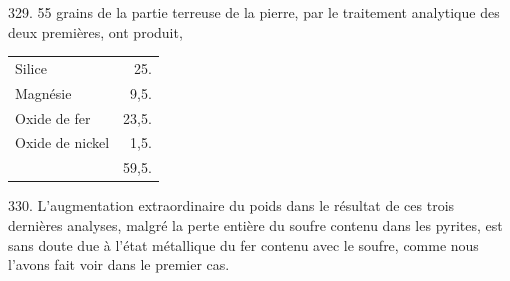\documentclass[a4paper, 11pt, oneside, polutonikogreek, french]{article}
\begin{document}
329. 55 grains de la partie terreuse de la pierre, par le traitement analytique des deux premières, ont produit,

\begin{table}[!ht]
    \centering
    \bfseries
    \Fontauri
    \Large
    \begin{tabular}{l r}
        Silice & 25. \\
        Magnésie & 9,5. \\
        Oxide de fer & 23,5. \\
        Oxide de nickel & 1,5. \\ \hline
        ~ & 59,5. \\
    \end{tabular}
\end{table}

330. L'augmentation extraordinaire du poids dans le résultat de ces trois dernières analyses, malgré la perte entière du soufre contenu dans les pyrites, est sans doute due à l'état métallique du fer contenu avec le soufre, comme nous l'avons fait voir dans le premier cas.
\end{document}
